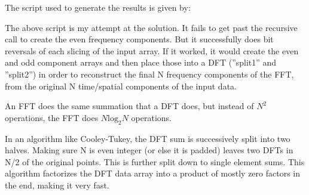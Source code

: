 The script used to generate the results is given by:
  



The above script is my attempt at the solution. It fails to get past the recursive call to create the even frequency components. But it successfully does bit reversals of each slicing of the input array. If it worked, it would create the even and odd component arrays and then place those into a DFT (''split1'' and ''split2'') in order to reconstruct the final N frequency components of the FFT, from the original N time/spatial components of the input data.

An FFT does the same summation that a DFT does, but instead of $N^2$ operations, the FFT does $N\text{log}_2N$ operations.

In an algorithm like Cooley-Tukey, the DFT sum is successively split into two halves. Making sure N is even integer (or else it is padded) leaves two DFTs in N/2 of the original points. This is further split down to single element sums. This algorithm factorizes the DFT data array into a product of mostly zero factors in the end, making it very fast.